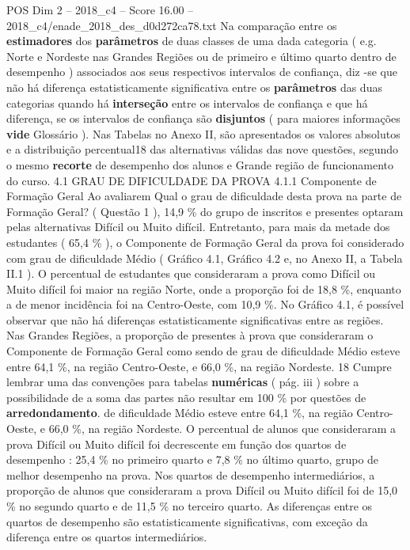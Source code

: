 \begin{textsample}{POS Dim 2 – 2018\_c4 – Score 16.00 – 2018\_c4/enade\_2018\_des\_d0d272ca78.txt}
Na comparação entre os \textbf{estimadores} dos \textbf{parâmetros} de duas classes de uma dada categoria ( e.g.
Norte e Nordeste nas Grandes Regiões ou de primeiro e último quarto dentro de desempenho ) associados aos seus respectivos intervalos de confiança, diz -se que não há diferença estatisticamente significativa entre os \textbf{parâmetros} das duas categorias quando há \textbf{interseção} entre os intervalos de confiança e que há diferença, se os intervalos de confiança são \textbf{disjuntos} ( para maiores informações \textbf{vide} Glossário ).
Nas Tabelas no Anexo II, são apresentados os valores absolutos e a distribuição percentual18 das alternativas válidas das nove questões, segundo o mesmo \textbf{recorte} de desempenho dos alunos e Grande região de funcionamento do curso. 4.1 GRAU DE DIFICULDADE DA PROVA 4.1.1 Componente de Formação Geral Ao avaliarem Qual o grau de dificuldade desta prova na parte de Formação Geral? ( Questão 1 ), 14,9 \% do grupo de inscritos e presentes optaram pelas alternativas Difícil ou Muito difícil.
Entretanto, para mais da metade dos estudantes ( 65,4 \% ), o Componente de Formação Geral da prova foi considerado com grau de dificuldade Médio ( Gráfico 4.1, Gráfico 4.2 e, no Anexo II, a Tabela II.1 ).
O percentual de estudantes que consideraram a prova como Difícil ou Muito difícil foi maior na região Norte, onde a proporção foi de 18,8 \%, enquanto a de menor incidência foi na Centro-Oeste, com 10,9 \%.
No Gráfico 4.1, é possível observar que não há diferenças estatisticamente significativas entre as regiões.
Nas Grandes Regiões, a proporção de presentes à prova que consideraram o Componente de Formação Geral como sendo de grau de dificuldade Médio esteve entre 64,1 \%, na região Centro-Oeste, e 66,0 \%, na região Nordeste. 18 Cumpre lembrar uma das convenções para tabelas \textbf{numéricas} ( pág. iii ) sobre a possibilidade de a soma das partes não resultar em 100 \% por questões de \textbf{arredondamento}. de dificuldade Médio esteve entre 64,1 \%, na região Centro-Oeste, e 66,0 \%, na região Nordeste.
O percentual de alunos que consideraram a prova Difícil ou Muito difícil foi decrescente em função dos quartos de desempenho : 25,4 \% no primeiro quarto e 7,8 \% no último quarto, grupo de melhor desempenho na prova.
Nos quartos de desempenho intermediários, a proporção de alunos que consideraram a prova Difícil ou Muito difícil foi de 15,0 \% no segundo quarto e de 11,5 \% no terceiro quarto.
As diferenças entre os quartos de desempenho são estatisticamente significativas, com exceção da diferença entre os quartos intermediários.

\end{textsample}
